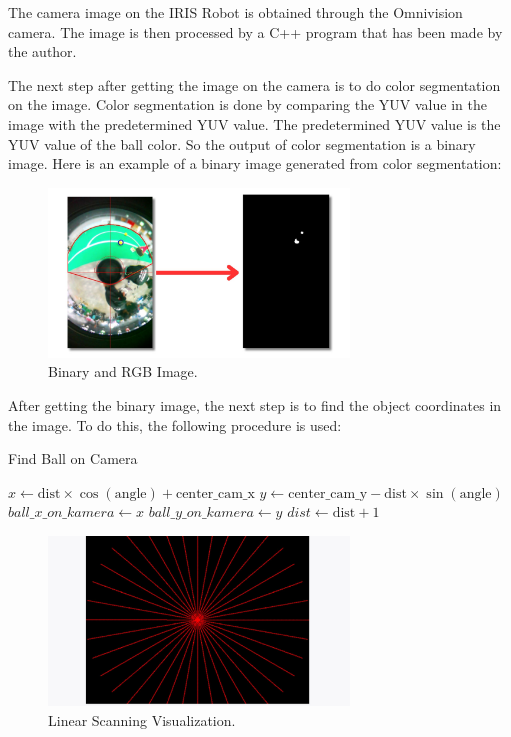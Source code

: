The camera image on the IRIS Robot is obtained through the Omnivision camera. The image is then processed by a C++ program that has been made by the author. 

The next step after getting the image on the camera is to do color segmentation on the image. Color segmentation is done by comparing the YUV value in the image with the predetermined YUV value. The predetermined YUV value is the YUV value of the ball color. So the output of color segmentation is a binary image. Here is an example of a binary image generated from color segmentation:


\begin{figure}[H]
  \centering
  \includegraphics[width=8cm]{gambar/threshold.jpg}
  \caption{Binary and RGB Image.}
  \label{fig:diag332}
\end{figure}

After getting the binary image, the next step is to find the object coordinates in the image. To do this, the following procedure is used: 


\begin{algorithm}[H]
  \caption{Find Ball on Camera}\label{alg:process_lines}
  \begin{algorithmic}[1]
          \State {}
              \State $x \gets \text{dist} \times \cos(\text{angle}) + \text{center\_cam\_x}$
              \State $y \gets \text{center\_cam\_y} - \text{dist} \times \sin(\text{angle})$
                  \State $ball\_x\_on\_kamera \gets x$
                  \State $ball\_y\_on\_kamera \gets y$
                  \State {}
              \EndIf
              \State $dist \gets \text{dist} + 1$
          \EndFor
      \EndFor
  \EndProcedure
  \end{algorithmic}
\end{algorithm}

\begin{figure}[H]
  \centering
  \includegraphics[width=8cm]{gambar/linear.jpg}
  \caption{Linear Scanning Visualization.}
  \label{fig:diag333}
\end{figure}

